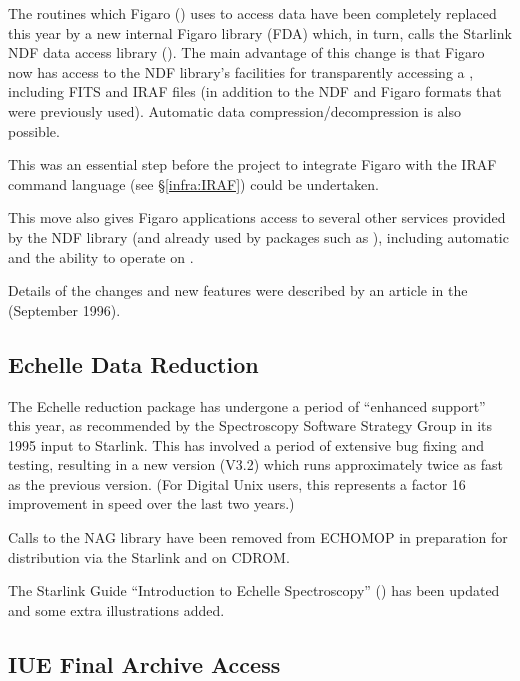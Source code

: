 The routines which Figaro () uses to access data
have been completely replaced this year by a new internal Figaro
library (FDA) which, in turn, calls the Starlink NDF data access
library (). The main advantage of this change is
that Figaro now has access to the NDF library's facilities for
transparently accessing a , including FITS and IRAF files (in addition
to the NDF and Figaro formats that were previously used). Automatic
data compression/decompression is also possible.

This was an essential step before the project to integrate Figaro with
the IRAF command language (see \S\ref{infra:IRAF}) could be
undertaken.

This move also gives Figaro applications access to several other
services provided by the NDF library (and already used by packages
such as ), including automatic  and the ability to
operate on .

Details of the changes and new features were described by an article
in the  (September
1996).

\subsection{Echelle Data Reduction}

The  Echelle reduction package has undergone a
period of ``enhanced support'' this year, as recommended by the
Spectroscopy Software Strategy Group in its 1995 input to
Starlink. This has involved a period of extensive bug fixing and
testing, resulting in a new version (V3.2) which runs approximately
twice as fast as the previous version. (For Digital Unix users, this
represents a factor 16 improvement in speed over the last two years.)

Calls to the NAG library have been removed from ECHOMOP in preparation
for distribution via the Starlink  and on CDROM.

The Starlink Guide ``Introduction to Echelle Spectroscopy''
() has been updated and some extra illustrations
added.

\subsection{IUE Final Archive Access}

